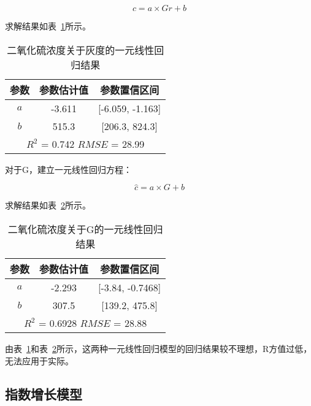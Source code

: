 $$c=a \times Gr+b$$

求解结果如表~\ref{SO2_Gr_linear}所示。

\begin{table}[]
    \centering
    \caption{二氧化硫浓度关于灰度的一元线性回归结果}
    \label{SO2_Gr_linear}
    \begin{tabular}{@{}ccc@{}}
    \toprule
    参数       & 参数估计值      & 参数置信区间                   \\ \midrule
    $a$      & -3.611     & {[}-6.059, -1.163{]}     \\
    $b$      & 515.3      & {[}206.3, 824.3{]}       \\ \midrule
    \multicolumn{3}{c}{$R^2$ = 0.742 $RMSE$ = 28.99} \\ \bottomrule
    \end{tabular}
    \end{table}


对于G，建立一元线性回归方程：

$$\hat{c}=a \times G+b$$

求解结果如表~\ref{SO2_G_linear}所示。

\begin{table}[]
    \centering
    \caption{二氧化硫浓度关于G的一元线性回归结果}
    \label{SO2_G_linear}
    \begin{tabular}{@{}ccc@{}}
    \toprule
    参数       & 参数估计值      & 参数置信区间                   \\ \midrule
    $a$      & -2.293     & {[}-3.84, -0.7468{]}     \\
    $b$      & 307.5      & {[}139.2, 475.8{]}       \\ \midrule
    \multicolumn{3}{c}{$R^2$ = 0.6928 $RMSE$ = 28.88} \\ \bottomrule
    \end{tabular}
\end{table}


由表~\ref{SO2_Gr_linear}和表~\ref{SO2_G_linear}所示，这两种一元线性回归模型的回归结果较不理想，R方值过低，无法应用于实际。

\subsection{指数增长模型}

